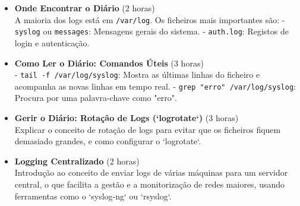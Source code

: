 \documentclass[10pt,a4paper]{article}
\begin{document}
	\begin{itemize}
		\item \textbf{Onde Encontrar o Diário} (2 horas) \\
		A maioria dos logs está em \texttt{/var/log}. Os ficheiros mais importantes são:
		- \texttt{syslog} ou \texttt{messages}: Mensagens gerais do sistema.
		- \texttt{auth.log}: Registos de login e autenticação.
		
		\item \textbf{Como Ler o Diário: Comandos Úteis} (3 horas) \\
		- \texttt{tail -f /var/log/syslog}: Mostra as últimas linhas do ficheiro e acompanha as novas linhas em tempo real.
		- \texttt{grep "erro" /var/log/syslog}: Procura por uma palavra-chave como "erro".
		
		\item \textbf{Gerir o Diário: Rotação de Logs (`logrotate`)} (3 horas) \\
		Explicar o conceito de rotação de logs para evitar que os ficheiros fiquem demasiado grandes, e como configurar o `logrotate`.
		
		\item \textbf{Logging Centralizado} (2 horas) \\
		Introdução ao conceito de enviar logs de várias máquinas para um servidor central, o que facilita a gestão e a monitorização de redes maiores, usando ferramentas como o `syslog-ng` ou `rsyslog`.
		
	\end{itemize}
	
\end{document}
